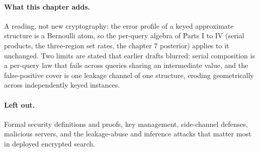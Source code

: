 \paragraph{What this chapter adds.}
A reading, not new cryptography: the error profile of a keyed approximate
structure is a Bernoulli atom, so the per-query algebra of Parts I to IV
(serial products, the three-region set rates, the chapter 7 posterior)
applies to it unchanged. Two limits are stated that earlier drafts
blurred: serial composition is a per-query law that fails across queries
sharing an intermediate value, and the false-positive cover is one leakage
channel of one structure, eroding geometrically across independently keyed
instances.

\paragraph{Left out.}
Formal security definitions and proofs, key management, side-channel
defenses, malicious servers, and the leakage-abuse and inference attacks
that matter most in deployed encrypted search.
